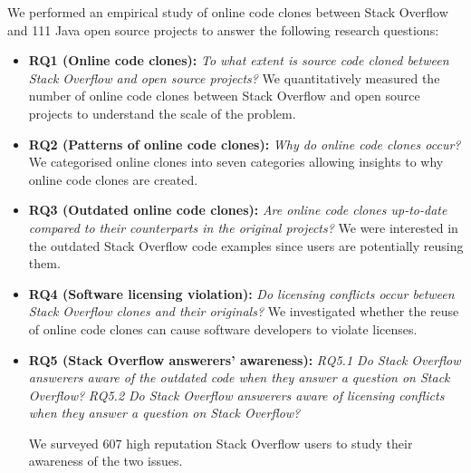 \documentclass[10pt,journal,compsoc]{IEEEtran}
\begin{document}
We performed an empirical study of online code clones between Stack
Overflow and 111 Java open source projects to answer the following
research questions:
\begin{itemize}
	\item \textbf{RQ1 (Online code clones): }\textit{To what extent is source
		code cloned between Stack Overflow and open source projects?} We
	quantitatively measured the number of online code clones between Stack
	Overflow and open source projects to understand the scale of the
	problem. 
	\item \textbf{RQ2 (Patterns of online code clones): }\textit{Why do online
		code clones occur?} We categorised online clones into seven
	categories allowing insights to why online code clones are created.
	\item \textbf{RQ3 (Outdated online code clones): }\textit{Are
		online code clones up-to-date compared to their counterparts in the
		original projects?} We were interested in the outdated Stack
	Overflow code examples since users are potentially reusing
	them. 
	\item \textbf{RQ4 (Software licensing violation): }\textit{Do
		licensing conflicts occur between Stack Overflow clones and their
		originals?} We investigated whether the reuse of online code clones
	can cause software developers to violate licenses.
	\item \textbf{RQ5 (Stack Overflow answerers' awareness): }
		\subitem \textit{RQ5.1 Do Stack Overflow
		answerers aware of the outdated code when
		they answer a question on Stack Overflow?} 
		\subitem \textit{RQ5.2 Do Stack Overflow
			answerers aware of licensing conflicts when
			they answer a question on Stack Overflow?} 
	
	We surveyed 607 high reputation Stack Overflow users to study their
	awareness of the two issues.
\end{itemize}
\end{document}
